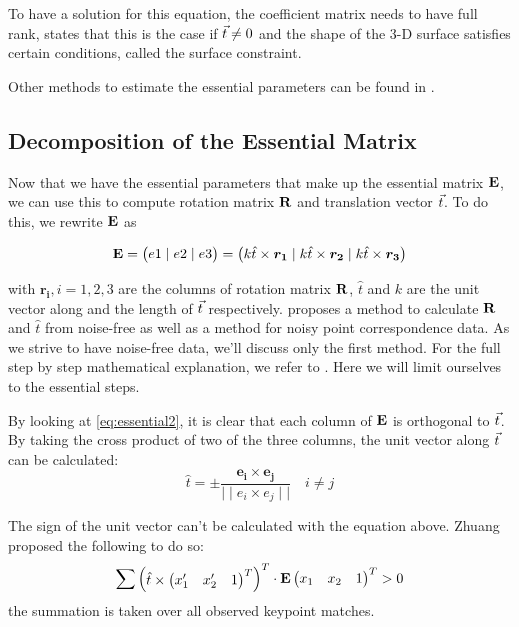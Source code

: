 To have a solution for this equation, the coefficient matrix needs to have full rank, \cite{tekalp} states that this is the case if $\vec t \neq 0$ and the shape of the 3-D surface satisfies certain conditions, called the surface constraint.

Other methods to estimate the essential parameters can be found in \cite{tekalp}.

\subsection{Decomposition of the Essential Matrix}
Now that we have the essential parameters that make up the essential matrix $\mathbf{E}$, we can use this to compute rotation matrix $\mathbf{R}$ and translation vector $\vec t$. To do this, we rewrite $\mathbf{E}$ as 

\begin{equation} \label{eq:essential2}
    \mathbf{E} = 
    \begin{pmatrix}
        e1 \mid e2 \mid e3
    \end{pmatrix} = 
    \begin{pmatrix}
        k \hat{t} \times \boldsymbol{r_1} \mid
        k \hat{t} \times \boldsymbol{r_2} \mid
        k \hat{t} \times \boldsymbol{r_3} 
    \end{pmatrix}
\end{equation}

with $\boldsymbol{r_i}, i = 1, 2, 3$ are the columns of rotation matrix $\mathbf{R}$, $\hat{t}$ and $k$ are the unit vector along and the length of $\vec t$ respectively. \cite{tekalp} proposes a method to calculate $\mathbf{R}$ and  $\hat{t}$ from noise-free as well as a method for noisy point correspondence data. As we strive to have noise-free data, we'll discuss only the first method. For the full step by step mathematical explanation, we refer to \cite{tekalp}. Here we will limit ourselves to the essential steps.\bigskip

By looking at \autoref{eq:essential2}, it is clear that each column of $\mathbf{E}$ is orthogonal to $\vec t$. By taking the cross product of two of the three columns, the unit vector along $\vec t$ can be calculated:
\begin{equation}
    \hat{t} = \pm \frac{\boldsymbol{e_i \times e_j}}{\mid\mid e_i \times e_j\mid\mid}
    \quad i \neq j
\end{equation}

The sign of the unit vector can't be calculated with the equation above. Zhuang \cite{ZHUANG1989175} proposed the following to do so:
\begin{equation}
    \sum\begin{pmatrix}
        \hat{t} \times \begin{pmatrix}
            x_1' & x_2' & 1
        \end{pmatrix}^T
    \end{pmatrix}^T
    \cdot \mathbf{E}\begin{pmatrix}
        x_1 & x_2 & 1
    \end{pmatrix}^T
    > 0
\end{equation}
the summation is taken over all observed keypoint matches.\bigskip

